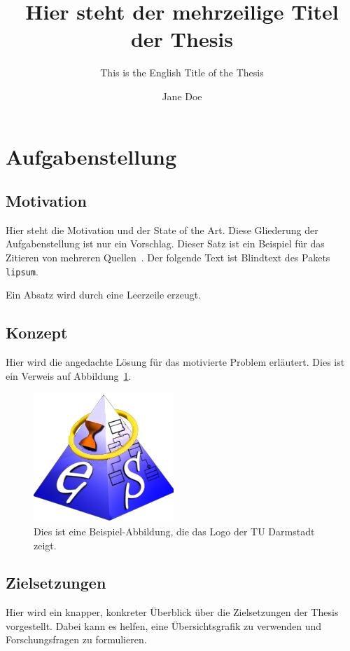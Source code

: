 \documentclass[
	ngerman,
	ruledheaders=section,%
	class=report,%
	thesis={type=master},%
	accentcolor=1b,%
	custommargins=false,%
	marginpar=false,%
	BCOR=12mm,%
	parskip=half-,%
	fontsize=11pt,%
	IMRAD=false,%
]{tudapub}
\begin{document}
\frontmatter


\title{Hier steht der mehrzeilige Titel der Thesis}
\subtitle{This is the English Title of the Thesis} %
\author[J. Doe]{Jane Doe}


\submissiondate{\today}
\examdate{\today}

\maketitle

\mainmatter

\chapter*{Aufgabenstellung}

\section*{Motivation}

Hier steht die Motivation und der State of the Art.
Diese Gliederung der Aufgabenstellung ist nur ein Vorschlag.
Dieser Satz ist ein Beispiel für das Zitieren von mehreren Quellen~\cite{Luthmann2017,Luthmann2019,Ruland2018}.
Der folgende Text ist Blindtext des Pakets \texttt{lipsum}.
\lipsum[1]

Ein Absatz wird durch eine Leerzeile erzeugt.
\lipsum[2]



\section*{Konzept}

Hier wird die angedachte Lösung für das motivierte Problem erläutert.
Dies ist ein Verweis auf Abbildung~\ref{fig:some-figure}.
\lipsum[3]

\begin{figure}[tp]
    \centering
    \includegraphics[width=.3\linewidth]{figures/es_logo_gross.jpg}
    \caption{Dies ist eine Beispiel-Abbildung, die das Logo der TU Darmstadt zeigt.}\label{fig:some-figure}
\end{figure}



\section*{Zielsetzungen}

Hier wird ein knapper, konkreter Überblick über die Zielsetzungen der Thesis vorgestellt.
Dabei kann es helfen, eine Übersichtsgrafik zu verwenden und Forschungsfragen zu formulieren.
\lipsum[4]





\end{document}
